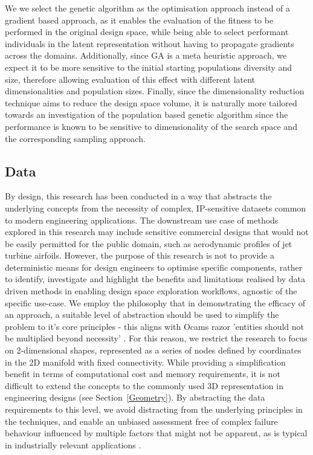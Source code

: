 \documentclass{article}
\begin{document}
We we select the genetic algorithm as the optimisation approach instead of a gradient based approach, as it enables the evaluation of the fitness to be performed in the original design space, while being able to select performant individuals in the latent representation without having to propagate gradients across the domains. Additionally, since GA is a meta heuristic approach, we expect it to be more sensitive to the initial starting populations diversity and size, therefore allowing evaluation of this effect with different latent dimensionalities and population sizes. Finally, since the dimensionality reduction technique aims to reduce the design space volume, it is naturally more tailored towards an investigation of the population based genetic algorithm since the performance is known to be sensitive to dimensionality of the search space and the corresponding sampling approach.

\subsection{Data}
By design, this research has been conducted in a way that abstracts the underlying concepts from the necessity of complex, IP-sensitive datasets common to modern engineering applications. The downstream use case of methods explored in this research may include sensitive commercial designs that would not be easily permitted for the public domain, such as aerodynamic profiles of jet turbine airfoils. However, the purpose of this research is not to provide a deterministic means for design engineers to optimise specific components, rather to identify, investigate and highlight the benefits and limitations realised by data driven methods in enabling design space exploration workflows, agnostic of the specific use-case. We employ the philosophy that in demonstrating the efficacy of an approach, a suitable level of abstraction should be used to simplify the problem to it's core principles - this aligns with Ocams razor 'entities should not be multiplied beyond necessity' \citep{Gori2024}. For this reason, we restrict the research to focus on 2-dimensional shapes, represented as a series of nodes defined by coordinates in the 2D manifold with fixed connectivity. While providing a simplification benefit in terms of computational cost and memory requirements, it is not difficult to extend the concepts to the commonly used 3D representation in engineering designs (see Section~\ref{Geometry}). By abstracting the data requirements to this level, we avoid distracting from the underlying principles in the techniques, and enable an unbiased assessment free of complex failure behaviour influenced by
multiple factors that might not be apparent, as is typical in industrially relevant applications \citep{Hobbs2021}.
\end{document}
